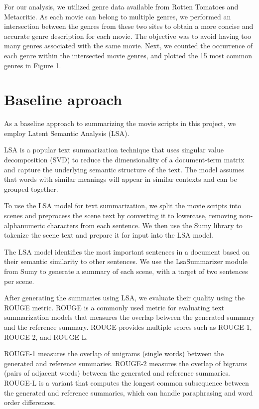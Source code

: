 \documentclass[fleqn,moreauthors,10pt]{ds_report}
\begin{document}
For our analysis, we utilized genre data available from Rotten Tomatoes and Metacritic. As each movie can belong to multiple genres, we performed an intersection between the genres from these two sites to obtain a more concise and accurate genre description for each movie. The objective was to avoid having too many genres associated with the same movie. Next, we counted the occurrence of each genre within the intersected movie genres, and plotted the 15 most common genres in Figure 1.



\section*{Baseline aproach}

As a baseline approach to summarizing the movie scripts in this project, we employ Latent Semantic Analysis (LSA). 

LSA is a popular text summarization technique that uses singular value decomposition (SVD) to reduce the dimensionality of a document-term matrix and capture the underlying semantic structure of the text. The model assumes that words with similar meanings will appear in similar contexts and can be grouped together.

To use the LSA model for text summarization, we split the movie scripts into scenes and preprocess the scene text by converting it to lowercase, removing non-alphanumeric characters from each sentence. We then use the Sumy library to tokenize the scene text and prepare it for input into the LSA model.

The LSA model identifies the most important sentences in a document based on their semantic similarity to other sentences. We use the LsaSummarizer module from Sumy to generate a summary of each scene, with a target of two sentences per scene.

After generating the summaries using LSA, we evaluate their quality using the ROUGE metric. ROUGE is a commonly used metric for evaluating text summarization models that measures the overlap between the generated summary and the reference summary. ROUGE provides multiple scores such as ROUGE-1, ROUGE-2, and ROUGE-L.

ROUGE-1 measures the overlap of unigrams (single words) between the generated and reference summaries. ROUGE-2 measures the overlap of bigrams (pairs of adjacent words) between the generated and reference summaries. ROUGE-L is a variant that computes the longest common subsequence between the generated and reference summaries, which can handle paraphrasing and word order differences.
\end{document}
